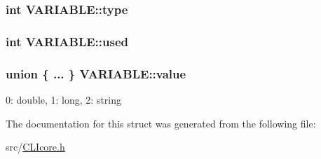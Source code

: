 \hypertarget{structVARIABLE_a84814331e54156c3ac9fbe6d2b851daf}{
\subsubsection[{type}]{\setlength{\rightskip}{0pt plus 5cm}int V\+A\+R\+I\+A\+B\+L\+E\+::type}}\label{structVARIABLE_a84814331e54156c3ac9fbe6d2b851daf}
\hypertarget{structVARIABLE_a33fcb1d4034cdf238453dc4ac3f17290}{
\subsubsection[{used}]{\setlength{\rightskip}{0pt plus 5cm}int V\+A\+R\+I\+A\+B\+L\+E\+::used}}\label{structVARIABLE_a33fcb1d4034cdf238453dc4ac3f17290}
\hypertarget{structVARIABLE_ac78c074d5d0c437357a205d97ee58c70}{
\subsubsection[{value}]{\setlength{\rightskip}{0pt plus 5cm}union \{ ... \}   V\+A\+R\+I\+A\+B\+L\+E\+::value}}\label{structVARIABLE_ac78c074d5d0c437357a205d97ee58c70}
0\+: double, 1\+: long, 2\+: string 

The documentation for this struct was generated from the following file\+:\begin{DoxyCompactItemize}
\item 
src/\hyperlink{CLIcore_8h}{C\+L\+Icore.\+h}\end{DoxyCompactItemize}
